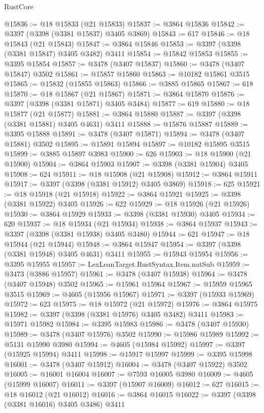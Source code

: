 \begin{lexlean}{RustCore}
\begin{coremodule}
@15836 := @18 @15833 (@21 @15833)
@15837 := @3864 @15836
@15842 := @3397 (@3398 (@3381 @15837) @3405 @3869)
@15843 := 617
@15846 := @18 @15843 (@21 @15843)
@15847 := @3864 @15846
@15853 := @3397 (@3398 (@3381 @15847) @3405 @3482) @3411
@15854 := @15842 @15853
@15855 := @3395 @15854
@15857 := @3478 (@3407 @15837)
@15860 := @3478 (@3407 @15847) @3502
@15861 := @15857 @15860
@15863 := @10182 @15861 @3515
@15865 := @15832 (@15855 @15863)
@15866 := @3885 @15865
@15867 := 618
@15870 := @18 @15867 (@21 @15867)
@15871 := @3864 @15870
@15876 := @3397 (@3398 (@3381 @15871) @3405 @3484)
@15877 := 619
@15880 := @18 @15877 (@21 @15877)
@15881 := @3864 @15880
@15887 := @3397 (@3398 (@3381 @15881) @3405 @4631) @3411
@15888 := @15876 @15887
@15889 := @3395 @15888
@15891 := @3478 (@3407 @15871)
@15894 := @3478 (@3407 @15881) @3502
@15895 := @15891 @15894
@15897 := @10182 @15895 @3515
@15899 := @3885 @15897 @3983
@15900 := 626
@15903 := @18 @15900 (@21 @15900)
@15904 := @3864 @15903
@15907 := @3398 (@3381 @15904) @3405
@15908 := 624
@15911 := @18 @15908 (@21 @15908)
@15912 := @3864 @15911
@15917 := @3397 (@3398 (@3381 @15912) @3405 @3869)
@15918 := 625
@15921 := @18 @15918 (@21 @15918)
@15922 := @3864 @15921
@15925 := @3398 (@3381 @15922) @3405
@15926 := 622
@15929 := @18 @15926 (@21 @15926)
@15930 := @3864 @15929
@15933 := @3398 (@3381 @15930) @3405
@15934 := 620
@15937 := @18 @15934 (@21 @15934)
@15938 := @3864 @15937
@15943 := @3397 (@3398 (@3381 @15938) @3405 @3480)
@15944 := 621
@15947 := @18 @15944 (@21 @15944)
@15948 := @3864 @15947
@15954 := @3397 (@3398 (@3381 @15948) @3405 @4631) @3411
@15955 := @15943 @15954
@15956 := @3395 @15955
@15957 := LexLeanTarget.RustSyntax.Item.natSub
@15959 := @3473 (@3886 @15957)
@15961 := @3478 (@3407 @15938)
@15964 := @3478 (@3407 @15948) @3502
@15965 := @15961 @15964
@15967 := @15959 @15965 @3515
@15969 := @4605 (@15956 @15967)
@15971 := @3397 (@15933 @15969)
@15972 := 623
@15975 := @18 @15972 (@21 @15972)
@15976 := @3864 @15975
@15982 := @3397 (@3398 (@3381 @15976) @3405 @3482) @3411
@15983 := @15971 @15982
@15984 := @3395 @15983
@15986 := @3478 (@3407 @15930)
@15989 := @3478 (@3407 @15976) @3502
@15990 := @15986 @15989
@15992 := @5131 @15990 @3980
@15994 := @4605 (@15984 @15992)
@15997 := @3397 (@15925 @15994) @3411
@15998 := @15917 @15997
@15999 := @3395 @15998
@16001 := @3478 (@3407 @15912)
@16004 := @3478 (@3407 @15922) @3502
@16005 := @16001 @16004
@16007 := @7593 @16005 @3980
@16009 := @4605 (@15999 @16007)
@16011 := @3397 (@15907 @16009)
@16012 := 627
@16015 := @18 @16012 (@21 @16012)
@16016 := @3864 @16015
@16022 := @3397 (@3398 (@3381 @16016) @3405 @3486) @3411

\end{coremodule}
\end{lexlean}
